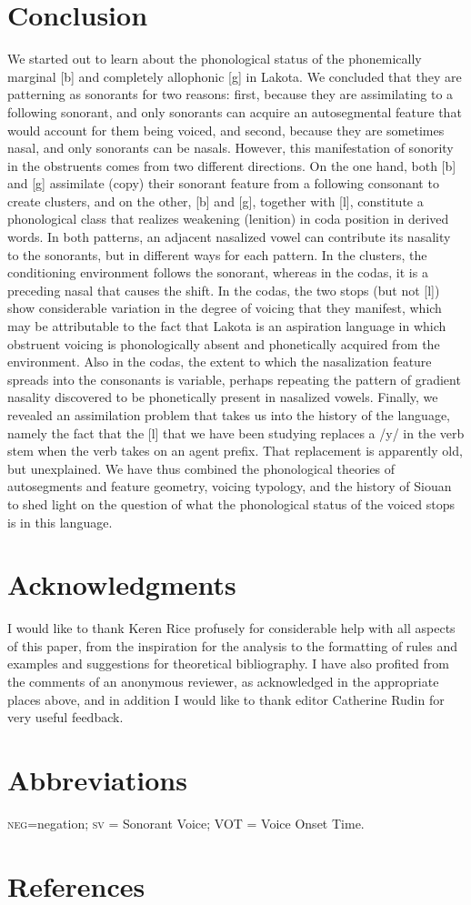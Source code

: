 \documentclass[output=paper]{LSP/langsci}
\begin{document}
\section{Conclusion}

We started out to learn about the phonological status of the phonemically marginal [b] and completely allophonic [g] in Lakota. We concluded that they are patterning as sonorants for two reasons: first, because they are assimilating to a following sonorant, and only sonorants can acquire an autosegmental feature that would account for them being voiced, and second, because they are sometimes nasal, and only sonorants can be nasals. However, this manifestation of sonority in the obstruents comes from two different directions. On the one hand, both [b] and [g] assimilate (copy) their sonorant feature from a following consonant to create clusters, and on the other, [b] and [g], together with [l], constitute a phonological class that realizes weakening (lenition) in coda position in derived words. In both patterns, an adjacent nasalized vowel can contribute its nasality to the sonorants, but in different ways for each pattern. In the clusters, the conditioning environment follows the sonorant, whereas in the codas, it is a preceding nasal that causes the shift. In the codas, the two stops (but not [l]) show considerable variation in the degree of voicing that they manifest, which may be attributable to the fact that Lakota is an aspiration language in which obstruent voicing is phonologically absent and phonetically acquired from the environment. Also in the codas, the extent to which the nasalization feature spreads into the consonants is variable, perhaps repeating the pattern of gradient nasality discovered to be phonetically present in nasalized vowels. Finally, we revealed an assimilation problem that takes us into the history of the language, namely the fact that the [l] that we have been studying replaces a /y/ in the verb stem when the verb takes on an agent prefix. That replacement is apparently old, but unexplained.
We have thus combined the phonological theories of autosegments and feature geometry, voicing typology, and the history of Siouan to shed light on the question of what the phonological status of the voiced stops is in this language.

\section*{Acknowledgments}

I would like to thank Keren Rice profusely for considerable help with all aspects of this paper, from the inspiration for the analysis to the formatting of rules and examples and suggestions for theoretical bibliography. I have also profited from the comments of an anonymous reviewer, as acknowledged in the appropriate places above, and in addition I would like to thank editor Catherine Rudin for very useful feedback.

\section*{Abbreviations}
\textsc{neg}=negation; \textsc{sv} = Sonorant Voice; VOT = Voice Onset Time.

\section*{References}

\printbibliography[heading=subbibliography,notkeyword=this]
 
\end{document}
